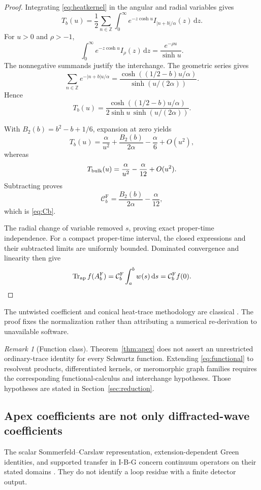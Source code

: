 \documentclass[11pt,a4paper]{article}
\newcommand{\ZZ}{\mathbb Z}
\newcommand{\dd}{\mathrm d}
\newcommand{\Fr}{\mathrm F}
\newcommand{\Ccb}{\mathcal C}
\newcommand{\abs}[1]{\lvert #1\rvert}
\newcommand{\loc}[1]{\nolinkurl{#1}}
\newcommand{\ApTr}{\operatorname{Tr}_{\rm ap}}
\theoremstyle{plain}
\theoremstyle{definition}
\theoremstyle{remark}
\newtheorem{remark}[theorem]{Remark}
\numberwithin{equation}{section}
\begin{document}
\begin{proof}
Integrating \eqref{eq:heatkernel} in the angular and radial variables
gives
\[
T_b(u)=\frac12\sum_{n\in\ZZ}
 \int_0^\infty e^{-z\cosh u}
 I_{\abs{n+b}/\alpha}(z)\,\dd z.
\]
For \(u>0\) and \(\rho>-1\),
\[
\int_0^\infty e^{-z\cosh u}I_\rho(z)\,\dd z
 =\frac{e^{-\rho u}}{\sinh u}.
\]
The nonnegative summands justify the interchange.
The geometric series gives
\[
\sum_{n\in\ZZ}e^{-\abs{n+b}u/\alpha}
 =
\frac{\cosh((1/2-b)u/\alpha)}{\sinh(u/(2\alpha))}.
\]
Hence
\begin{equation}
T_b(u)=
\frac{\cosh((1/2-b)u/\alpha)}
 {2\sinh u\,\sinh(u/(2\alpha))}.
\label{eq:closedAbel}
\end{equation}

With \(B_2(b)=b^2-b+1/6\), expansion at zero yields
\[
T_b(u)
 =\frac{\alpha}{u^2}
  +\frac{B_2(b)}{2\alpha}-\frac{\alpha}{6}
  +O(u^2),
\]
whereas
\[
T_{\rm bulk}(u)
 =\frac{\alpha}{u^2}-\frac{\alpha}{12}+O(u^2).
\]
Subtracting proves
\[
\Ccb_b^\Fr
 =\frac{B_2(b)}{2\alpha}-\frac{\alpha}{12},
\]
which is \eqref{eq:Cb}.

The radial change of variable removed \(s\), proving exact
proper-time independence. For a compact proper-time interval,
the closed expressions and their subtracted limits are uniformly
bounded. Dominated convergence and linearity then give
\[
\ApTr f(A_b^\Fr)
 =\Ccb_b^\Fr\int_a^b w(s)\,\dd s
 =\Ccb_b^\Fr f(0).
\]
\end{proof}

The untwisted coefficient and conical heat-trace methodology are
classical \cite{Fursaev1994,FursaevMiele1997,Vassilevich}.
The proof fixes the normalization rather than attributing a
numerical re-derivation to unavailable software.

\begin{remark}[Function class]
Theorem~\ref{thm:apex} does not assert an unrestricted ordinary-trace
identity for every Schwartz function.
Extending \eqref{eq:functional} to resolvent products,
differentiated kernels, or meromorphic graph families requires
the corresponding functional-calculus and interchange hypotheses.
Those hypotheses are stated in Section~\ref{sec:reduction}.
\end{remark}

\subsection{Apex coefficients are not only diffracted-wave coefficients}

The scalar Sommerfeld--Carslaw representation, extension-dependent
Green identities, and supported transfer in I-B-G concern continuum
operators on their stated domains
\cite[{\loc{thm:green}, \loc{eq:Carslaw},
\loc{thm:transfer}}]{CheungIBG}.
They do not identify a loop residue with a finite detector output.
\end{document}
